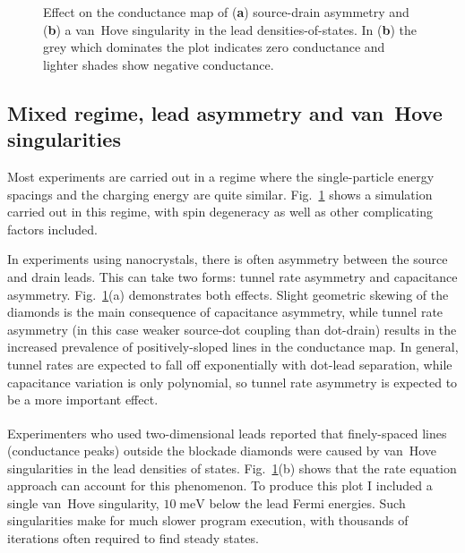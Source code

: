 \documentclass[a4paper,11pt]{article}
\let\oldcite\cite
\renewcommand{\cite}[1]{\textsuperscript{\oldcite{#1}}}
\begin{document}
    \begin{figure}[h]
    \begin{center}
        \caption{Effect on the conductance map of (\textbf{a}) source-drain asymmetry and (\textbf{b}) a van~Hove singularity in the lead densities-of-states. In (\textbf{b}) the grey which dominates the plot indicates zero conductance and lighter shades show negative conductance.}
        \label{fig:Asymmetry}
    \end{center}
    \end{figure}

    \newpage
    \subsection{Mixed regime, lead asymmetry and van~Hove singularities}

    Most experiments are carried out in a regime where the single-particle energy spacings and the charging energy are quite similar. Fig.~\ref{fig:Asymmetry} shows a simulation carried out in this regime, with spin degeneracy as well as other complicating factors included.

    In experiments using nanocrystals, there is often asymmetry between the source and drain leads. This can take two forms: tunnel rate asymmetry and capacitance asymmetry. Fig.~\ref{fig:Asymmetry}(a) demonstrates both effects. Slight geometric skewing of the diamonds is the main consequence of capacitance asymmetry, while tunnel rate asymmetry (in this case weaker source-dot coupling than dot-drain) results in the increased prevalence of positively-sloped lines in the conductance map. In general, tunnel rates are expected to fall off exponentially with dot-lead separation, while capacitance variation is only polynomial, so tunnel rate asymmetry is expected to be a more important effect.

    Experimenters who used two-dimensional leads\cite{Fuechsle-2010} reported that finely-spaced lines (conductance peaks) outside the blockade diamonds were caused by van~Hove singularities in the lead densities of states. Fig.~\ref{fig:Asymmetry}(b) shows that the rate equation approach can account for this phenomenon. To produce this plot I included a single van~Hove singularity, $10\;\mathrm{meV}$ below the lead Fermi energies. Such singularities make for much slower program execution, with thousands of iterations often required to find steady states.
\end{document}
